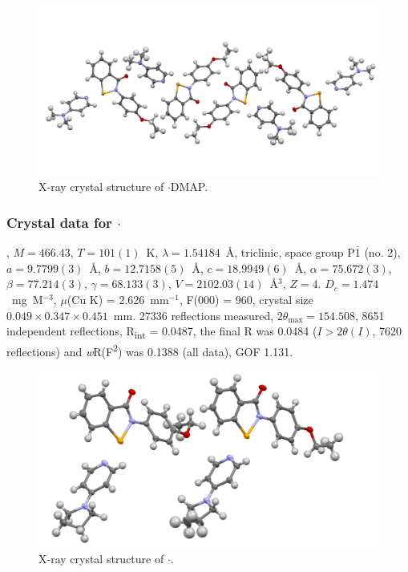 \begin{refsection}
\begin{figure}
  \includegraphics[width=0.6\linewidth]{Figures/ebs-4oet-dmap-xtal.pdf}
  \caption{X-ray crystal structure of \texorpdfstring{$\cdot$DMAP}{C22 H23 N3 O2 Se}.}
\end{figure}

\subsubsection{Crystal data for \texorpdfstring{$\cdot$}{C24 H25 N3 O2 Se}}
, $M=466.43$, $T=101(1)$~K, $\lambda=1.54184$~\AA, triclinic, space group P$\bar{1}$ (no. 2), $a = 9.7799(3)$~\AA, $b = 12.7158(5)$~\AA, $c = 18.9949(6)$~\AA, $\alpha = 75.672(3)$\degree, $\beta = 77.214(3)$\degree, $\gamma = 68.133(3)$\degree, $V = 2102.03(14)$~\AA$^{3}$, $Z = 4$. $D_{c}= 1.474$~mg~M$^{-3}$, $\mu$(Cu K\a) = 2.626~mm$^{-1}$, F(000) = 960, crystal size $0.049 \times 0.347 \times 0.451$~mm. 27336 reflections measured, $2\theta_{\mathrm{max}}=154.508$\degree, 8651 independent reflections, R\textsubscript{int} = 0.0487, the final R was 0.0484 ($I > 2\theta(I)$, 7620 reflections) and \emph{w}R(F\textsuperscript{2}) was 0.1388 (all data), GOF 1.131.

\begin{figure}
  \includegraphics[width=0.6\linewidth]{Figures/ebs-4oet-pyrrol-xtal.pdf}
  \caption{X-ray crystal structure of \texorpdfstring{$\cdot$}{C24 H25 N3 O2 Se}.}
\end{figure}


\end{refsection}
